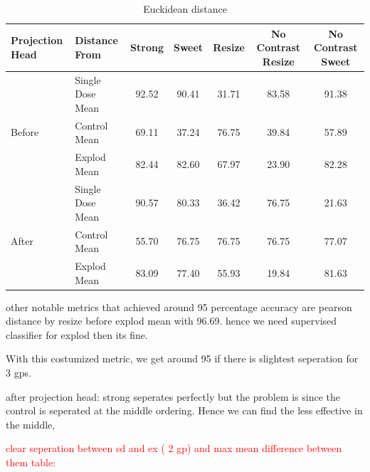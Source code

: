 \begin{table}[H]
  \centering
  \begin{tabular}{@{}llccccc@{}}
  \toprule
  Projection Head & Distance From      & Strong & Sweet & Resize & No Contrast Resize & No Contrast Sweet \\ \midrule
                  & Single Dose Mean   & 92.52      & 90.41     & 31.71      & 83.58                  &  91.38                \\
  Before          & Control Mean       & 69.11      & 37.24     & 76.75      & 39.84                  & 57.89                 \\
                  & Explod Mean        & 82.44      & 82.60    & 67.97      & 23.90                  & 82.28                 \\ \midrule
                  & Single Dose Mean   & 90.57     & 80.33     & 36.42      & 76.75                  & 21.63                 \\
  After           & Control Mean       & 55.70      & 76.75     & 76.75      & 76.75                  & 77.07                 \\
                  & Explod Mean        & 83.09      & 77.40     & 55.93      & 19.84                  &  81.63                \\ \bottomrule
  \end{tabular}
  \caption{Euckidean distance}
  \label{tab:table_label}
\end{table}


other notable metrics that achieved around 95 percentage accuracy are pearson distance by resize before explod mean with 96.69. hence we need supervised classifier for explod then its fine.






With this costumized metric, we get around 95 if there is slightest seperation for 3 gps.

after projection head: strong seperates perfectly but the problem is since the control is seperated at the middle ordering. Hence we can find the less effective in the middle,

\textcolor{red}{clear seperation between sd and ex ( 2 gp) and max mean difference between them table:}


